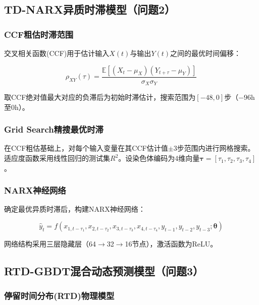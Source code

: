 \documentclass[12pt,a4paper]{ctexart}
\begin{document}
\subsection{TD-NARX异质时滞模型（问题2）}

\subsubsection{CCF粗估时滞范围}

交叉相关函数(CCF)用于估计输入$X(t)$与输出$Y(t)$之间的最优时间偏移：

\begin{equation}\label{eq:ccf}
\rho_{XY}(\tau) = \frac{\mathbb{E}[(X_t - \mu_X)(Y_{t+\tau} - \mu_Y)]}{\sigma_X \sigma_Y}
\end{equation}

取CCF绝对值最大对应的负滞后为初始时滞估计，搜索范围为$[-48, 0]$步（$-96$h至0h）。

\subsubsection{Grid Search精搜最优时滞}

在CCF粗估基础上，对每个输入变量在其CCF估计值$\pm3$步范围内进行网格搜索。
适应度函数采用线性回归的测试集$R^2$。设染色体编码为4维向量$\boldsymbol{\tau} = [\tau_1, \tau_2, \tau_3, \tau_4]$。

\subsubsection{NARX神经网络}

确定最优异质时滞后，构建NARX神经网络：

\begin{equation}\label{eq:narx}
\hat{y}_t = f(x_{1,t-\tau_1}, x_{2,t-\tau_2}, x_{3,t-\tau_3}, x_{4,t-\tau_4}, y_{t-1}, y_{t-2}, y_{t-3}; \boldsymbol{\theta})
\end{equation}

网络结构采用三层隐藏层（64$\to$32$\to$16节点），激活函数为ReLU\cite{ref5}。

\subsection{RTD-GBDT混合动态预测模型（问题3）}

\subsubsection{停留时间分布(RTD)物理模型}
\end{document}
